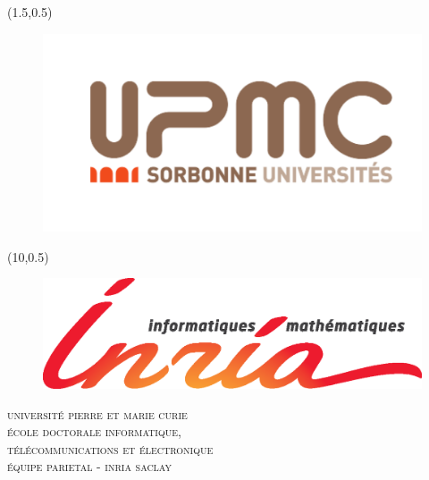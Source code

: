 \documentclass[nobib, a4paper, notoc, twoside, justified]{tufte-book}
\begin{document}
\begin{titlepage}
\begin{fullwidth}
\begin{center}

\begin{textblock}{4}(1.5,0.5)
\begin{figure}
\includegraphics[width=\linewidth]{figures/logo_upmc.pdf}
\end{figure}
\end{textblock}


\begin{textblock}{4.8}(10,0.5)
\begin{figure}
\includegraphics[width=\linewidth]{figures/logotheque-inriascientifiquefr.eps}
\end{figure}
\end{textblock}



\vspace*{30pt}
\textsc{{\huge université pierre et marie curie} \\
{\vspace{10pt} \LARGE école doctorale informatique, \\télécommunications et électronique} \\
{\vspace{10pt}\LARGE équipe parietal - inria saclay}}


\end{center}
\end{fullwidth}
\end{titlepage}
\end{document}
